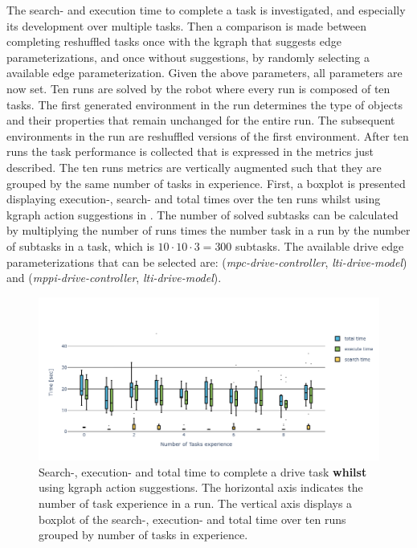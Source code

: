 The search- and execution time to complete a task is investigated, and especially its development over multiple tasks. Then a comparison is made between completing reshuffled tasks once with the \ac{kgraph} that suggests edge parameterizations, and once without suggestions, by randomly selecting a available edge parameterization. Given the above parameters, all parameters are now set. Ten runs are solved by the robot where every run is composed of ten tasks. The first generated environment in the run determines the type of objects and their properties that remain unchanged for the entire run. The subsequent environments in the run are reshuffled versions of the first environment. After ten runs the task performance is collected that is expressed in the metrics just described. The ten runs metrics are vertically augmented such that they are grouped by the same number of tasks in experience. First, a boxplot is presented displaying execution-, search- and total times over the ten runs whilst using \ac{kgraph} action suggestions in . The number of solved subtasks can be calculated by multiplying the number of runs times the number task in a run by the number of subtasks in a task, which is $10 \cdot 10 \cdot 3 = 300$ subtasks. The available drive edge parameterizations that can be selected are: (\textit{mpc-drive-controller}, \textit{lti-drive-model}) and (\textit{mppi-drive-controller}, \textit{lti-drive-model}).\bs

\begin{figure}[H]
    \centering
    \includegraphics[width=\textwidth]{figures/results/random_drive_time_kgraph}
    \caption{Search-, execution- and total time to complete a drive task \textbf{whilst} using \ac{kgraph} action suggestions. The horizontal axis indicates the number of task experience in a run. The vertical axis displays a boxplot of the search-, execution- and total time over ten runs grouped by number of tasks in experience.}%
   \label{fig:random_drive_time_kgraph}
\end{figure}

